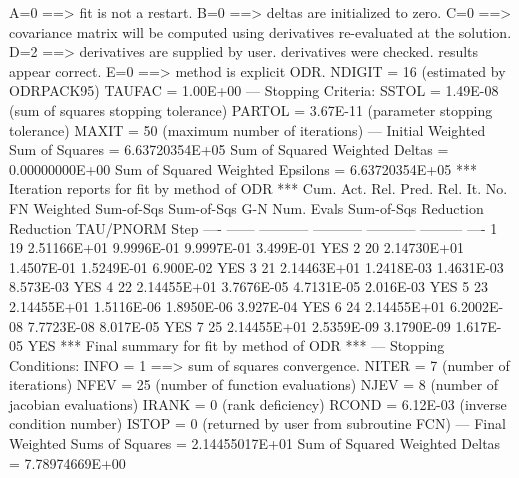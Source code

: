 {{                       A=0 ==> fit is not a restart.
                       B=0 ==> deltas are initialized to zero.
                       C=0 ==> covariance matrix will be computed using
                               derivatives re-evaluated at the solution.
                       D=2 ==> derivatives are supplied by user.
                               derivatives were checked.
                               results appear correct.
                       E=0 ==> method is explicit ODR.
       NDIGIT =    16          (estimated by ODRPACK95)
       TAUFAC =     1.00E+00
\phantom{blank line}
 --- Stopping Criteria:
        SSTOL =     1.49E-08   (sum of squares stopping tolerance)
       PARTOL =     3.67E-11   (parameter stopping tolerance)
        MAXIT =    50          (maximum number of iterations)
\phantom{blank line}
 --- Initial Weighted Sum of Squares        =                    6.63720354E+05
         Sum of Squared Weighted Deltas     =   0.00000000E+00
         Sum of Squared Weighted Epsilons   =   6.63720354E+05
\phantom{blank line}
 *** Iteration reports for fit by method of ODR ***
\phantom{blank line}
\phantom{blank line}
         Cum.                 Act. Rel.   Pred. Rel.
  It.  No. FN     Weighted   Sum-of-Sqs   Sum-of-Sqs              G-N
 Num.   Evals   Sum-of-Sqs    Reduction    Reduction  TAU/PNORM  Step
 ----  ------  -----------  -----------  -----------  ---------  ----
\phantom{blank line}
    1      19  2.51166E+01   9.9996E-01   9.9997E-01  3.499E-01   YES
    2      20  2.14730E+01   1.4507E-01   1.5249E-01  6.900E-02   YES
    3      21  2.14463E+01   1.2418E-03   1.4631E-03  8.573E-03   YES
    4      22  2.14455E+01   3.7676E-05   4.7131E-05  2.016E-03   YES
    5      23  2.14455E+01   1.5116E-06   1.8950E-06  3.927E-04   YES
    6      24  2.14455E+01   6.2002E-08   7.7723E-08  8.017E-05   YES
    7      25  2.14455E+01   2.5359E-09   3.1790E-09  1.617E-05   YES
\phantom{blank line}
 *** Final summary for fit by method of ODR ***
\phantom{blank line}
 --- Stopping Conditions:
         INFO =     1 ==> sum of squares convergence.
        NITER =     7          (number of iterations)
         NFEV =    25          (number of function evaluations)
         NJEV =     8          (number of jacobian evaluations)
        IRANK =     0          (rank deficiency)
        RCOND =     6.12E-03   (inverse condition number)
        ISTOP =     0          (returned by user from subroutine FCN)
\phantom{blank line}
 --- Final Weighted Sums of Squares       =                     2.14455017E+01
         Sum of Squared Weighted Deltas   =    7.78974669E+00
}}
